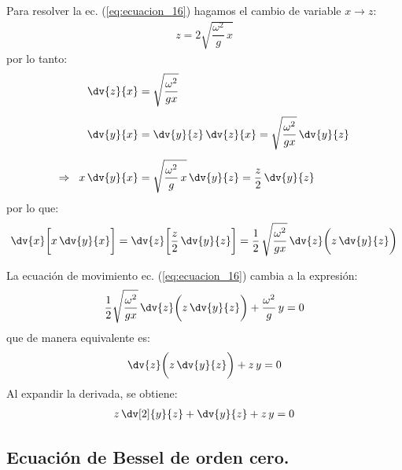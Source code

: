 Para resolver la ec. (\ref{eq:ecuacion_16}) hagamos el cambio de variable $x \to z$:
\begin{align}
z = 2 \sqrt{\dfrac{\omega^{2}}{g} \, x}
\label{eq:ecuacion_18}
\end{align}
por lo tanto:
\begin{align}
\begin{aligned}[b]
\dv{z}{x} &= \sqrt{\dfrac{\omega^{2}}{g x}} \\[0.5em]
\dv{y}{x} &= \dv{y}{z} \, \dv{z}{x} = \sqrt{\dfrac{\omega^{2}}{g x}} \, \dv{y}{z} \\[0.5em]
\Rightarrow \hspace{0.2cm} x \, \dv{y}{x} &= \sqrt{\dfrac{\omega^{2}}{g} \, x} \, \dv{y}{z} = \dfrac{z}{2} \, \dv{y}{z}
\end{aligned}
\label{eq:ecuacion_19}
\end{align}
por lo que:
\begin{align}
\dv{x} \bigg[x \, \dv{y}{x} \bigg] = \dv{z} \bigg[ \dfrac{z}{2} \, \dv{y}{z} \bigg] = \dfrac{1}{2} \, \sqrt{\dfrac{\omega^{2}}{g x}} \, \dv{z} \bigg( z \, \dv{y}{z} \bigg)
\label{eq:ecuacion_20}
\end{align}

La ecuación de movimiento ec. (\ref{eq:ecuacion_16}) cambia a la expresión:
\begin{align}
\dfrac{1}{2} \sqrt{\dfrac{\omega^{2}}{g x}} \, \dv{z} \bigg( z \, \dv{y}{z} \bigg) + \dfrac{\omega^{2}}{g} \, y = 0
\label{eq:ecuacion_21}
\end{align}
que de manera equivalente es:
\begin{align}
\dv{z} \bigg( z \, \dv{y}{z} \bigg) + z \, y = 0
\label{eq:ecuacion_22}
\end{align}
Al expandir la derivada, se obtiene:
\begin{align}
z \, \dv[2]{y}{z} + \dv{y}{z} + z \, y = 0
\label{eq:ecuacion_23}
\end{align}

\subsection{Ecuación de Bessel de orden cero.}


